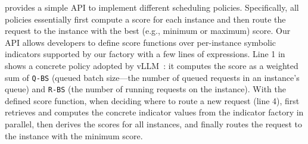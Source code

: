 {\sys} provides a simple API to implement different scheduling policies.
Specifically, all policies essentially first compute a score for each instance
and then route the request to the instance with the best (e.g., minimum or maximum) score.
Our API allows developers to define score functions over per-instance symbolic indicators supported by our factory 
with a few lines of expressions.
Line 1 in {} shows a concrete policy adopted by vLLM~\cite{vllm-code}:
it computes the score as a weighted sum of \texttt{Q-BS} (queued batch size---the number of queued requests in an instance's queue)
and \texttt{R-BS} (the number of running requests on the instance).
With the defined score function,
when deciding where to route a new request (line 4),
{\sys} first retrieves and computes the concrete indicator values from the indicator factory in parallel,
then derives the scores for all instances, and finally routes the request to the instance with the minimum score.


